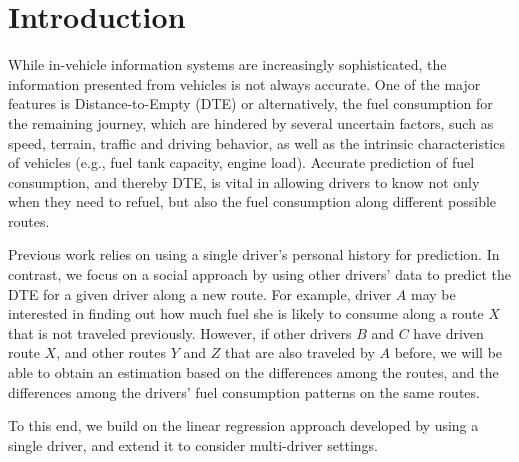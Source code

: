 \section{Introduction} \label{sec:intro}

While in-vehicle information systems are increasingly sophisticated, the information presented from vehicles is not always accurate. One of the major features is Distance-to-Empty (DTE) or alternatively, the fuel consumption for the remaining journey, which are hindered by several uncertain factors, such as speed, terrain, traffic and driving behavior, as well as the intrinsic characteristics of vehicles (e.g., fuel tank capacity, engine load). Accurate prediction of fuel consumption, and thereby DTE, is vital in allowing drivers to know not only when they need to refuel, but also the fuel consumption along different possible routes.

Previous work relies on using a single driver's personal history for prediction. In contrast, we focus on a social approach by using other drivers' data to predict the DTE for a given driver along a new route. For example, driver \(A\) may be interested in finding out how much fuel she is likely to consume along a route \(X\) that is not traveled previously. However, if other drivers \(B\) and \(C\) have driven route \(X\), and other routes \(Y\) and \(Z\) that are also traveled by \(A\) before, we will be able to obtain an estimation based on the differences among the routes, and the differences among the drivers' fuel consumption patterns on the same routes.

To this end, we build on the linear regression approach developed by \cite{rodgersetal2013} using a single driver, and extend it to consider multi-driver settings.
